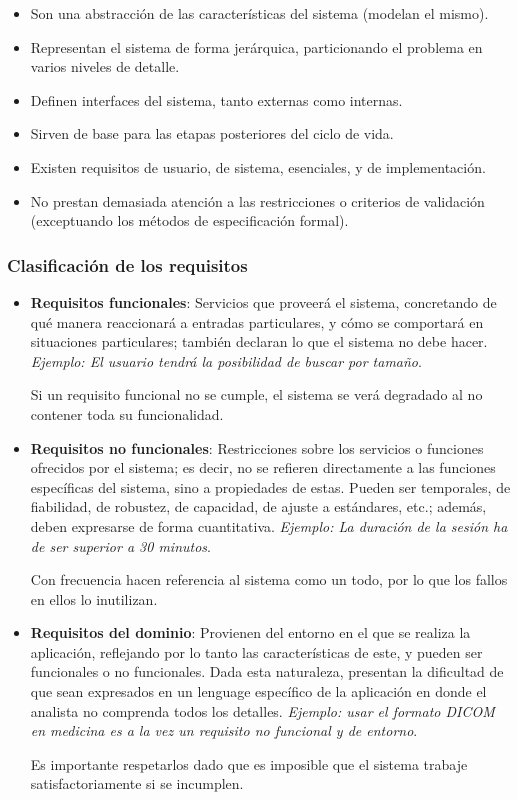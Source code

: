 \begin{itemize}
    \item Son una abstracción de las características del sistema (modelan el mismo).
    \item Representan el sistema de forma jerárquica, particionando el problema en varios niveles de detalle.
    \item Definen interfaces del sistema, tanto externas como internas.
    \item Sirven de base para las etapas posteriores del ciclo de vida.
    \item Existen requisitos de usuario, de sistema, esenciales, y de implementación.
    \item No prestan demasiada atención a las restricciones o criterios de validación (exceptuando los métodos de especificación formal).
\end{itemize}

\subsubsection{Clasificación de los requisitos}
\begin{itemize}
    \item \textbf{Requisitos funcionales}: Servicios que proveerá el sistema, concretando de qué manera reaccionará a entradas particulares, y cómo se comportará en situaciones particulares; también declaran lo que el sistema no debe hacer. \textit{Ejemplo: El usuario tendrá la posibilidad de buscar por tamaño}.
    
    Si un requisito funcional no se cumple, el sistema se verá degradado al no contener toda su funcionalidad.

    \item \textbf{Requisitos no funcionales}: Restricciones sobre los servicios o funciones ofrecidos por el sistema; es decir, no se refieren directamente a las funciones específicas del sistema, sino a propiedades de estas. Pueden ser temporales, de fiabilidad, de robustez, de capacidad, de ajuste a estándares, etc.; además, deben expresarse de forma cuantitativa. \textit{Ejemplo: La duración de la sesión ha de ser superior a 30 minutos}.
    
    Con frecuencia hacen referencia al sistema como un todo, por lo que los fallos en ellos lo inutilizan.

    \item \textbf{Requisitos del dominio}: Provienen del entorno en el que se realiza la aplicación, reflejando por lo tanto las características de este, y pueden ser funcionales o no funcionales. Dada esta naturaleza, presentan la dificultad de que sean expresados en un lenguage específico de la aplicación en donde el analista no comprenda todos los detalles. \textit{Ejemplo: usar el formato DICOM en medicina es a la vez un requisito no funcional y de entorno}.
    
    Es importante respetarlos dado que es imposible que el sistema trabaje satisfactoriamente si se incumplen.
\end{itemize}

